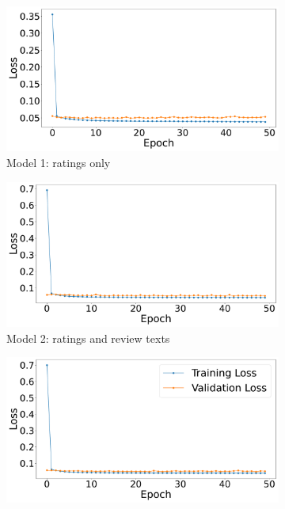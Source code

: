 \begin{figure}[h]
    \centering
    \begin{subfigure}{0.49\textwidth}
        \centering
        \includegraphics[width=\linewidth]{Figures/ncf_training_1.pdf} %
        \caption{Model 1: ratings only}
        \label{fig:model1} 
    \end{subfigure}
    \hfill
    \begin{subfigure}{0.49\textwidth}
        \centering
        \includegraphics[width=\linewidth]{Figures/ncf_training_2.pdf} %
        \caption{Model 2: ratings and review texts}
        \label{fig:model2}
    \end{subfigure}
    \hfill
    \begin{subfigure}{0.49\textwidth}
        \centering
        \includegraphics[width=\linewidth]{Figures/ncf_training_3.pdf} %

\end{subfigure}
\end{figure}
